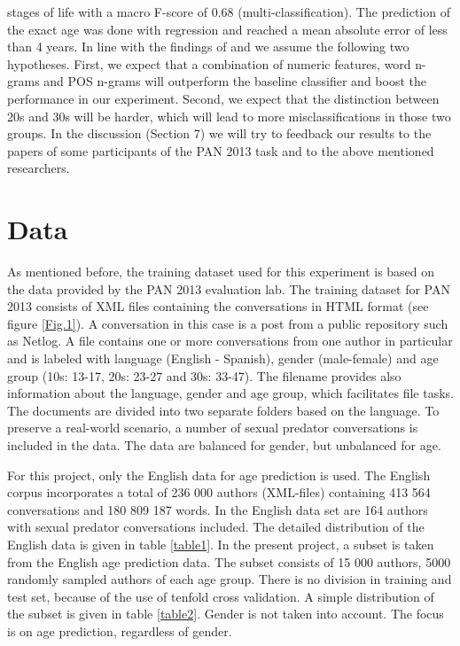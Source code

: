 \documentclass{clv3}
\begin{document}
stages of life with a macro F-score of 0.68 (multi-classification). The prediction of the exact age was done with regression and reached a mean absolute error of less than 4 years. In line with the findings of \citet{schler2006effects,argamon2009automatically} and \citet{nguyen2013old} we assume the following two hypotheses.  
First, we expect that a combination of numeric features, word n-grams and POS n-grams will outperform the baseline classifier and boost the performance in our experiment. Second, we expect that the distinction between 20s and 30s will be harder, which will lead to more misclassifications in those two groups. 
 In the discussion (Section 7) we will try to feedback our results to the papers of some participants of the PAN 2013 task and to the above mentioned researchers.   

\section{Data}
As mentioned before, the training dataset used for this experiment is based on the  data provided by the PAN 2013 evaluation lab. The training dataset for PAN 2013 consists of XML files containing the conversations in HTML format (see figure \ref{Fig.1}). A conversation in this case is a post from a public repository such as Netlog. A file contains one or more conversations from one author in particular and is labeled with language (English - Spanish), gender (male-female) and age group (10s: 13-17, 20s: 23-27 and 30s: 33-47).  The filename provides also information about  the language, gender and age group, which facilitates file tasks. The documents are divided into two separate  folders  based on the language. To preserve a real-world scenario, a number of sexual predator conversations is included in the data. The data are balanced for gender, but unbalanced for age.

For this project,  only the English data for age prediction is used. The English corpus incorporates a total of 236 000 authors (XML-files) containing 413 564 conversations and 180 809 187 words. In the English data set are 164 authors with sexual predator conversations included. The detailed distribution of the English data is given in table \ref{table1}. In the present project, a subset is taken from the English age prediction data. The subset consists of 15 000 authors, 5000 randomly sampled authors of each age group. There is no division in training and test set, because of the use of tenfold cross validation. A simple distribution of the subset is given in table \ref{table2}.  Gender is not taken into account. The focus is on age prediction, regardless of gender.
\end{document}
